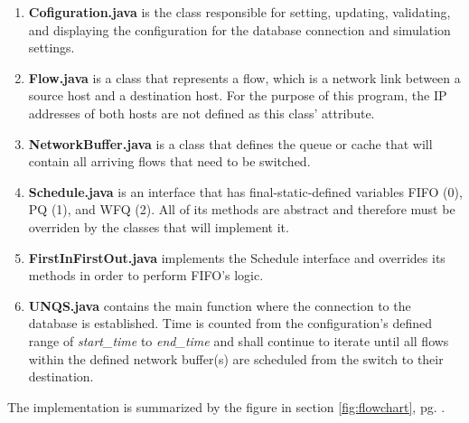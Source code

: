 \documentclass[journal]{IEEE/IEEEtran}
\begin{document}
\begin{enumerate}
\item \textbf{Cofiguration.java} is the class responsible for setting, updating, validating, and displaying the configuration for the database connection and simulation settings.

\item \textbf{Flow.java} is a class that represents a flow, which is a network link between a source host and a destination host. For the purpose of this program, the IP addresses of both hosts are not defined as this class' attribute.

\item \textbf{NetworkBuffer.java} is a class that defines the queue or cache that will contain all arriving flows that need to be switched.

\item \textbf{Schedule.java} is an interface that has final-static-defined variables FIFO (0), PQ (1), and WFQ (2). All of its methods are abstract and therefore must be overriden by the classes that will implement it.

\item \textbf{FirstInFirstOut.java} implements the Schedule interface and overrides its methods in order to perform FIFO's logic.

\item \textbf{UNQS.java} contains the main function where the connection to the database is established. Time is counted from the configuration's defined range of \textit{start\_time} to \textit{end\_time} and shall continue to iterate until all flows within the defined network buffer(s) are scheduled from the switch to their destination.
\end{enumerate}

The implementation is summarized by the figure in section \ref{fig:flowchart}, pg. \pageref{fig:flowchart}.
\end{document}
